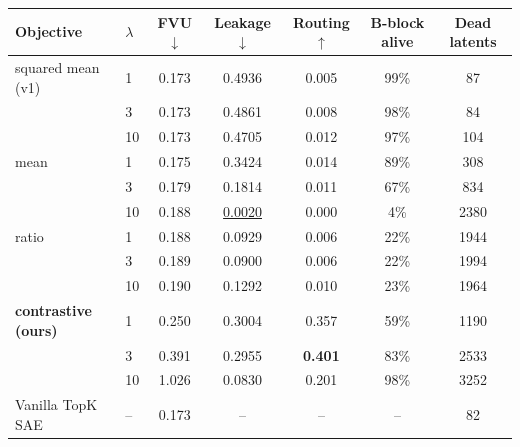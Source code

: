 \begin{tabular}{@{}llccccc@{}}
\toprule
Objective & $\lambda$ & FVU $\downarrow$ & Leakage $\downarrow$ & Routing $\uparrow$ & B-block alive & Dead latents \\
\midrule
squared mean (v1) & 1 & 0.173 & 0.4936 & 0.005 & 99\% & 87 \\
 & 3 & 0.173 & 0.4861 & 0.008 & 98\% & 84 \\
 & 10 & 0.173 & 0.4705 & 0.012 & 97\% & 104 \\
\addlinespace[2pt]
mean & 1 & 0.175 & 0.3424 & 0.014 & 89\% & 308 \\
 & 3 & 0.179 & 0.1814 & 0.011 & 67\% & 834 \\
 & 10 & 0.188 & \underline{0.0020} & 0.000 & 4\% & 2380 \\
\addlinespace[2pt]
ratio & 1 & 0.188 & 0.0929 & 0.006 & 22\% & 1944 \\
 & 3 & 0.189 & 0.0900 & 0.006 & 22\% & 1994 \\
 & 10 & 0.190 & 0.1292 & 0.010 & 23\% & 1964 \\
\addlinespace[2pt]
\textbf{contrastive (ours)} & 1 & 0.250 & 0.3004 & 0.357 & 59\% & 1190 \\
 & 3 & 0.391 & 0.2955 & \textbf{0.401} & 83\% & 2533 \\
 & 10 & 1.026 & 0.0830 & 0.201 & 98\% & 3252 \\
\midrule
Vanilla TopK SAE & -- & 0.173 & -- & -- & -- & 82 \\
\bottomrule
\end{tabular}
